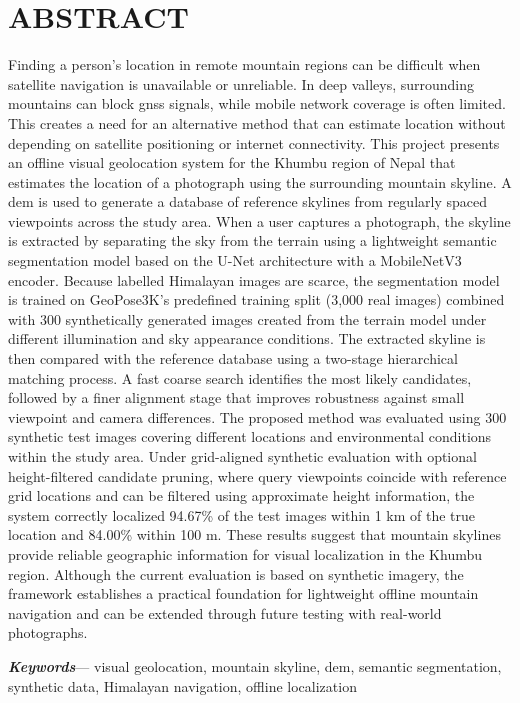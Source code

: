 

\chapter*{ABSTRACT}
{}


\bigskip
Finding a person's location in remote mountain regions can be difficult when satellite navigation is unavailable or unreliable. In deep valleys, surrounding mountains can block \gls{gnss} signals, while mobile network coverage is often limited. This creates a need for an alternative method that can estimate location without depending on satellite positioning or internet connectivity. This project presents an offline visual geolocation system for the Khumbu region of Nepal that estimates the location of a photograph using the surrounding mountain skyline. A \gls{dem} is used to generate a database of reference skylines from regularly spaced viewpoints across the study area. When a user captures a photograph, the skyline is extracted by separating the sky from the terrain using a lightweight semantic segmentation model based on the U-Net architecture with a MobileNetV3 encoder. Because labelled Himalayan images are scarce, the segmentation model is trained on GeoPose3K's predefined training split (3,000 real images) combined with 300 synthetically generated images created from the terrain model under different illumination and sky appearance conditions. The extracted skyline is then compared with the reference database using a two-stage hierarchical matching process. A fast coarse search identifies the most likely candidates, followed by a finer alignment stage that improves robustness against small viewpoint and camera differences. The proposed method was evaluated using 300 synthetic test images covering different locations and environmental conditions within the study area. Under grid-aligned synthetic evaluation with optional height-filtered candidate pruning, where query viewpoints coincide with reference grid locations and can be filtered using approximate height information, the system correctly localized 94.67\% of the test images within 1 km of the true location and 84.00\% within 100 m. These results suggest that mountain skylines provide reliable geographic information for visual localization in the Khumbu region. Although the current evaluation is based on synthetic imagery, the framework establishes a practical foundation for lightweight offline mountain navigation and can be extended through future testing with real-world photographs.

\vspace{1em}
\noindent\textit{\textbf{Keywords}}--- visual geolocation, mountain skyline, \acrshort{dem}, semantic segmentation, synthetic data, Himalayan navigation, offline localization
